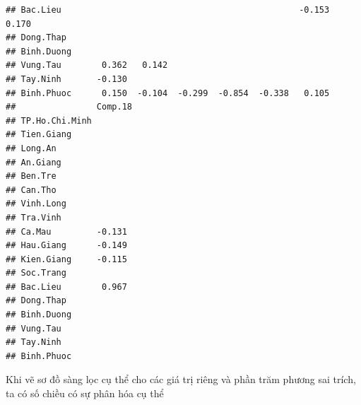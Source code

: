 \documentclass[../thesis.tex]{subfiles}
\begin{document}
\begin{verbatim}
## Bac.Lieu                                               -0.153   0.170         
## Dong.Thap                                                                     
## Binh.Duong                                                                    
## Vung.Tau        0.362   0.142                                                 
## Tay.Ninh       -0.130                                                         
## Binh.Phuoc      0.150  -0.104  -0.299  -0.854  -0.338   0.105                 
##                Comp.18
## TP.Ho.Chi.Minh        
## Tien.Giang            
## Long.An               
## An.Giang              
## Ben.Tre               
## Can.Tho               
## Vinh.Long             
## Tra.Vinh              
## Ca.Mau         -0.131 
## Hau.Giang      -0.149 
## Kien.Giang     -0.115 
## Soc.Trang             
## Bac.Lieu        0.967 
## Dong.Thap             
## Binh.Duong            
## Vung.Tau              
## Tay.Ninh              
## Binh.Phuoc            
\end{verbatim}

\newpage
Khi vẽ sơ đồ sàng lọc cụ thể cho các giá trị riêng và phần trăm phương sai trích, ta có số chiều có sự phân hóa cụ thể

\begin{Shaded}
	\begin{Highlighting}[]
\OtherTok{\textless{}{-}}\SpecialCharTok{::} \NormalTok{)}
\OtherTok{\textless{}{-}}\SpecialCharTok{\%\textgreater{}\%}\SpecialCharTok{::}
		 \NormalTok{,}
		 \NormalTok{,}
		 \NormalTok{,}
		 \NormalTok{)}
\OtherTok{\textless{}{-}}\SpecialCharTok{\%\textgreater{}\%}\SpecialCharTok{::}
		 \NormalTok{,}
		 \NormalTok{)}
\SpecialCharTok{::} \NormalTok{)}
	\end{Highlighting}
\end{Shaded}
\end{document}
